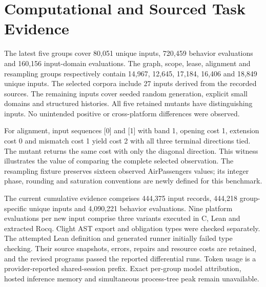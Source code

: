 \documentclass{article}
\begin{document}
\section{Computational and Sourced Task Evidence}

The latest five groups cover 80,051 unique inputs, 720,459 behavior evaluations and 160,156 input-domain evaluations. The graph, scope, lease, alignment and resampling groups respectively contain 14,967, 12,645, 17,184, 16,406 and 18,849 unique inputs. The selected corpora include 27 inputs derived from the recorded sources. The remaining inputs cover seeded random generation, explicit small domains and structured histories. All five retained mutants have distinguishing inputs. No unintended positive or cross-platform differences were observed.

For alignment, input sequences [0] and [1] with band 1, opening cost 1, extension cost 0 and mismatch cost 1 yield cost 2 with all three terminal directions tied. The mutant returns the same cost with only the diagonal direction. This witness illustrates the value of comparing the complete selected observation. The resampling fixture preserves sixteen observed AirPassengers values; its integer phase, rounding and saturation conventions are newly defined for this benchmark.

The current cumulative evidence comprises 444,375 input records, 444,218 group-specific unique inputs and 4,090,221 behavior evaluations. Nine platform evaluations per new input comprise three variants executed in C, Lean and extracted Rocq. Clight AST export and obligation types were checked separately. The attempted Lean definition and generated runner initially failed type checking. Their source snapshots, errors, repairs and resource costs are retained, and the revised programs passed the reported differential runs. Token usage is a provider-reported shared-session prefix. Exact per-group model attribution, hosted inference memory and simultaneous process-tree peak remain unavailable.
\end{document}
